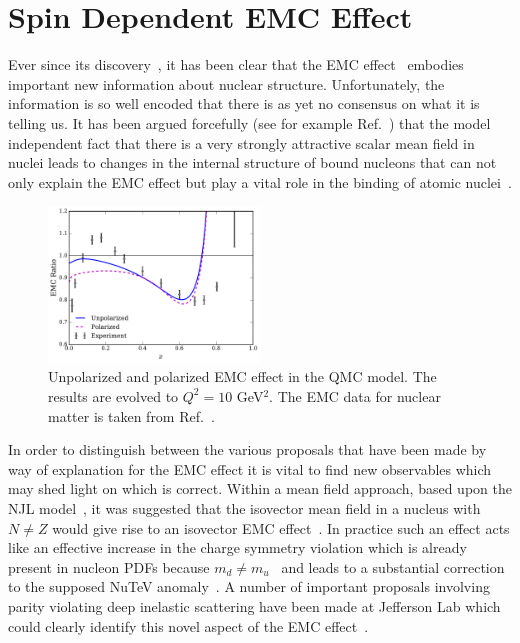\section{Spin Dependent EMC Effect}

Ever since its discovery~\cite{Aubert:1983xm,Bodek:1983ec}, it has been clear that the EMC 
effect~\cite{Geesaman:1995yd} embodies important new information about nuclear structure. Unfortunately, the information is so well encoded that there is as yet no consensus on what it is telling us. It has been argued forcefully (see for example Ref.~\cite{Thomas:2016bxx,Guichon:2018uew}) that the model independent fact that there is a very strongly attractive scalar mean field in nuclei leads to changes in the internal structure of bound nucleons that can not only explain the EMC effect but play a vital role in the binding of atomic nuclei~\cite{Stone:2017oqt,Stone:2016qmi}. 
%
    \begin{figure}[h!]
        \includegraphics[width=0.5\textwidth]{plots/EMC_Com_NLO_PDF.pdf}
        \caption{Unpolarized and polarized EMC effect in the QMC model. The results are evolved to $Q^2=10$ GeV$^2$. The EMC data for nuclear matter is taken from Ref.~\cite{Sick:1992pw}.}
	\label{fig:EMC_Com}
    \end{figure}
%

In order to distinguish between the various proposals that have been made by way of explanation for the EMC effect it is vital to find new observables which may shed light on which is correct. Within a mean field approach, based upon the NJL model~\cite{Bentz:2001vc}, it was suggested that the isovector mean field in a nucleus with $N \neq Z$ would give rise to an isovector EMC effect~\cite{Cloet:2009qs,Bentz:2009yy}. In practice such an effect acts like an effective increase in the charge symmetry violation which is already present in nucleon PDFs 
because $m_d \neq m_u$~\cite{Londergan:2009kj} and leads to a substantial correction to the supposed NuTeV anomaly~\cite{Cloet:2009qs,Bentz:2009yy}.  A number of important proposals involving parity violating deep inelastic scattering have been made at Jefferson Lab which could clearly identify this novel aspect of the EMC 
effect~\cite{Cloet:2012td}.

